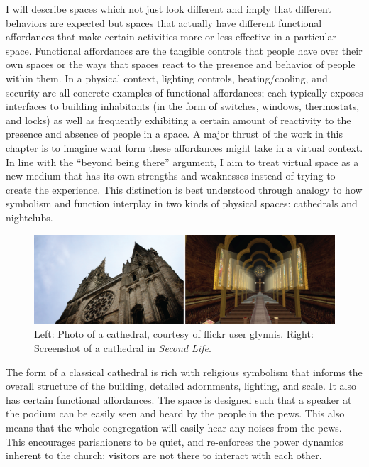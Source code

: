 I will describe spaces which not just look different and imply that different behaviors are expected but spaces that actually have different functional affordances that make certain activities more or less effective in a particular space. Functional affordances are the tangible controls that people have over their own spaces or the ways that spaces react to the presence and behavior of people within them. In a physical context, lighting controls, heating/cooling, and security are all concrete examples of functional affordances; each typically exposes interfaces to building inhabitants (in the form of switches, windows, thermostats, and locks) as well as frequently exhibiting a certain amount of reactivity to the presence and absence of people in a space. A major thrust of the work in this chapter is to imagine what form these affordances might take in a virtual context. In line with the ``beyond being there'' argument, I aim to treat virtual space as a new medium that has its own strengths and weaknesses instead of trying to create the experience. This distinction is best understood through analogy to how symbolism and function interplay in two kinds of physical spaces: cathedrals and nightclubs.

\begin{figure}[t]
	\includegraphics{figures/cathedral_comparison.png}
	\caption{Left: Photo of a cathedral, courtesy of flickr user glynnis. Right: Screenshot of a cathedral in \emph{Second Life}.}
	\label{fig:cathedral_comparison}
\end{figure}

The form of a classical cathedral is rich with religious symbolism that informs the overall structure of the building, detailed adornments, lighting, and scale. It also has certain functional affordances. The space is designed such that a speaker at the podium can be easily seen and heard by the people in the pews. This also means that the whole congregation will easily hear any noises from the pews. This encourages parishioners to be quiet, and re-enforces the power dynamics inherent to the church; visitors are not there to interact with each other.

